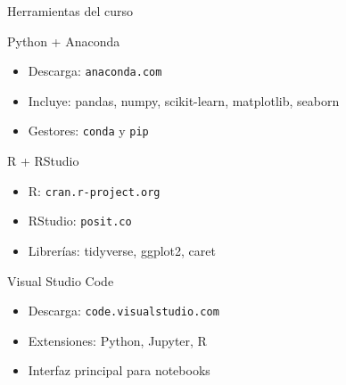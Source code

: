 \documentclass{beamer}
\begin{document}
\begin{frame}{Herramientas del curso}
\begin{block}{Python + Anaconda}
\begin{itemize}
    \item Descarga: \texttt{anaconda.com}
    \item Incluye: pandas, numpy, scikit-learn, matplotlib, seaborn
    \item Gestores: \texttt{conda} y \texttt{pip}
\end{itemize}
\end{block}

\begin{block}{R + RStudio}
\begin{itemize}
    \item R: \texttt{cran.r-project.org}
    \item RStudio: \texttt{posit.co}
    \item Librerías: tidyverse, ggplot2, caret
\end{itemize}
\end{block}

\begin{block}{Visual Studio Code}
\begin{itemize}
    \item Descarga: \texttt{code.visualstudio.com}
    \item Extensiones: Python, Jupyter, R
    \item Interfaz principal para notebooks
\end{itemize}
\end{block}
\end{frame}
\end{document}
